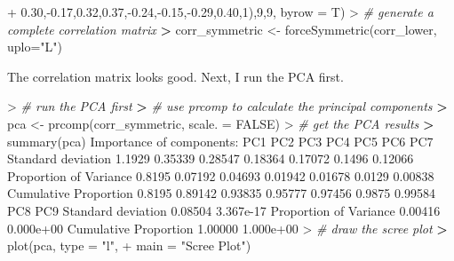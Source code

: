 \documentclass[
]{article}
\newenvironment{Shaded}{\begin{snugshade}}{\end{snugshade}}
\newcommand{\AttributeTok}[1]{\textcolor[rgb]{0.77,0.63,0.00}{#1}}
\newcommand{\CommentTok}[1]{\textcolor[rgb]{0.56,0.35,0.01}{\textit{#1}}}
\newcommand{\ConstantTok}[1]{\textcolor[rgb]{0.00,0.00,0.00}{#1}}
\newcommand{\DecValTok}[1]{\textcolor[rgb]{0.00,0.00,0.81}{#1}}
\newcommand{\ErrorTok}[1]{\textcolor[rgb]{0.64,0.00,0.00}{\textbf{#1}}}
\newcommand{\FloatTok}[1]{\textcolor[rgb]{0.00,0.00,0.81}{#1}}
\newcommand{\FunctionTok}[1]{\textcolor[rgb]{0.00,0.00,0.00}{#1}}
\newcommand{\NormalTok}[1]{#1}
\newcommand{\OtherTok}[1]{\textcolor[rgb]{0.56,0.35,0.01}{#1}}
\newcommand{\SpecialCharTok}[1]{\textcolor[rgb]{0.00,0.00,0.00}{#1}}
\newcommand{\StringTok}[1]{\textcolor[rgb]{0.31,0.60,0.02}{#1}}
\begin{document}
\begin{Shaded}
\begin{Highlighting}[]
\SpecialCharTok{+}                       \FloatTok{0.30}\NormalTok{,}\SpecialCharTok{{-}}\FloatTok{0.17}\NormalTok{,}\FloatTok{0.32}\NormalTok{,}\FloatTok{0.37}\NormalTok{,}\SpecialCharTok{{-}}\FloatTok{0.24}\NormalTok{,}\SpecialCharTok{{-}}\FloatTok{0.15}\NormalTok{,}\SpecialCharTok{{-}}\FloatTok{0.29}\NormalTok{,}\FloatTok{0.40}\NormalTok{,}\DecValTok{1}\NormalTok{),}\DecValTok{9}\NormalTok{,}\DecValTok{9}\NormalTok{, }\AttributeTok{byrow =}\NormalTok{ T)}
\SpecialCharTok{\textgreater{}} \CommentTok{\# generate a complete correlation matrix}
\ErrorTok{\textgreater{}}\NormalTok{ corr\_symmetric }\OtherTok{\textless{}{-}} \FunctionTok{forceSymmetric}\NormalTok{(corr\_lower, }\AttributeTok{uplo=}\StringTok{"L"}\NormalTok{)}
\end{Highlighting}
\end{Shaded}

The correlation matrix looks good. Next, I run the PCA first.

\begin{Shaded}
\begin{Highlighting}[]
\SpecialCharTok{\textgreater{}} \CommentTok{\# run the PCA first}
\ErrorTok{\textgreater{}} \CommentTok{\# use prcomp to calculate the principal components}
\ErrorTok{\textgreater{}}\NormalTok{ pca }\OtherTok{\textless{}{-}} \FunctionTok{prcomp}\NormalTok{(corr\_symmetric, }\AttributeTok{scale. =} \ConstantTok{FALSE}\NormalTok{)}
\SpecialCharTok{\textgreater{}} \CommentTok{\# get the PCA results}
\ErrorTok{\textgreater{}} \FunctionTok{summary}\NormalTok{(pca)}
\NormalTok{Importance of components}\SpecialCharTok{:}
\NormalTok{                          PC1     PC2     PC3     PC4     PC5    PC6     PC7}
\NormalTok{Standard deviation     }\FloatTok{1.1929} \FloatTok{0.35339} \FloatTok{0.28547} \FloatTok{0.18364} \FloatTok{0.17072} \FloatTok{0.1496} \FloatTok{0.12066}
\NormalTok{Proportion of Variance }\FloatTok{0.8195} \FloatTok{0.07192} \FloatTok{0.04693} \FloatTok{0.01942} \FloatTok{0.01678} \FloatTok{0.0129} \FloatTok{0.00838}
\NormalTok{Cumulative Proportion  }\FloatTok{0.8195} \FloatTok{0.89142} \FloatTok{0.93835} \FloatTok{0.95777} \FloatTok{0.97456} \FloatTok{0.9875} \FloatTok{0.99584}
\NormalTok{                           PC8       PC9}
\NormalTok{Standard deviation     }\FloatTok{0.08504} \FloatTok{3.367e{-}17}
\NormalTok{Proportion of Variance }\FloatTok{0.00416} \FloatTok{0.000e+00}
\NormalTok{Cumulative Proportion  }\FloatTok{1.00000} \FloatTok{1.000e+00}
\SpecialCharTok{\textgreater{}} \CommentTok{\# draw the scree plot }
\ErrorTok{\textgreater{}} \FunctionTok{plot}\NormalTok{(pca, }\AttributeTok{type =} \StringTok{"l"}\NormalTok{, }
\SpecialCharTok{+}      \AttributeTok{main =} \StringTok{"Scree Plot"}\NormalTok{)}
\end{Highlighting}
\end{Shaded}
\end{document}
